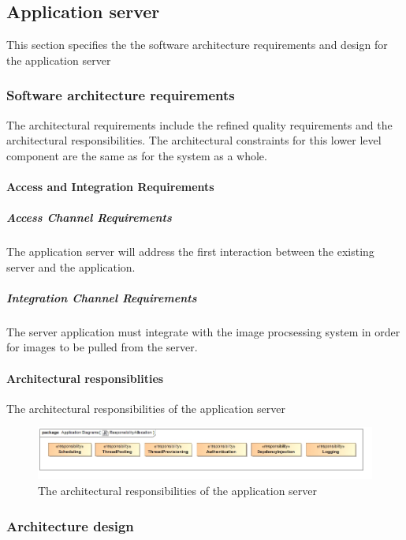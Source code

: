 \documentclass[a4paper,12pt]{report}
\begin{document}
	\subsection {Application server}
	This section specifies the the software architecture requirements and design for the application server
		\subsubsection {Software architecture requirements}
		The architectural requirements include the refined quality requirements and the architectural responsibilities. The architectural constraints for this lower level component are the same as for the system as a whole.
		
			\paragraph {Access and Integration Requirements}
				\subparagraph {Access Channel Requirements}
					The application server will address the first interaction between the existing server and the application. 
				\subparagraph {Integration Channel Requirements}
					The server application must integrate with the image procsessing system in order for images to be pulled from the server.	
			
			\FloatBarrier
			\paragraph {Architectural responsiblities}
				\hfill \break
				The architectural responsibilities of the 	application server
				\begin{figure}[H]
					\centering
					\includegraphics  [scale=0.5]{../Diagrams/applicationServerResponsibiltiesZ.png}
					\caption{The architectural responsibilities of the application server}
				\end{figure}		
		
		\subsubsection {Architecture design}	
			\FloatBarrier	
\end{document}
